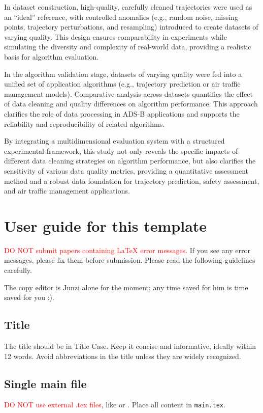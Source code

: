 In dataset construction, high-quality, carefully cleaned trajectories were used as an “ideal” reference, with controlled anomalies (e.g., random noise, missing points, trajectory perturbations, and resampling) introduced to create datasets of varying quality. This design ensures comparability in experiments while simulating the diversity and complexity of real-world data, providing a realistic basis for algorithm evaluation.

In the algorithm validation stage, datasets of varying quality were fed into a unified set of application algorithms (e.g., trajectory prediction or air traffic management models). Comparative analysis across datasets quantifies the effect of data cleaning and quality differences on algorithm performance. This approach clarifies the role of data processing in ADS-B applications and supports the reliability and reproducibility of related algorithms.

By integrating a multidimensional evaluation system with a structured experimental framework, this study not only reveals the specific impacts of different data cleaning strategies on algorithm performance, but also clarifies the sensitivity of various data quality metrics, providing a quantitative assessment method and a robust data foundation for trajectory prediction, safety assessment, and air traffic management applications.

\iffalse
\section{User guide for this template}

\textcolor{red}{DO NOT submit papers containing LaTeX error messages.} If you see any error messages, please fix them before submission. Please read the following guidelines carefully.

The copy editor is Junzi alone for the moment; any time saved for him is time saved for you :).

\subsection{Title}
The title should be in Title Case. Keep it concise and informative, ideally within 12 words. Avoid abbreviations in the title unless they are widely recognized.

\subsection{Single main file}
\textcolor{red}{DO NOT use external .tex files}, like \verb|| or \verb||. Place all content in \texttt{main.tex}.

